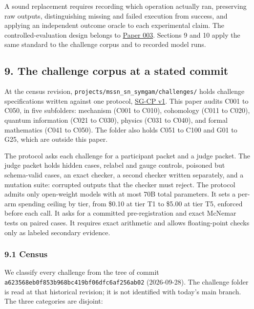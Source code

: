\documentclass[
  11pt,
]{article}
\begin{document}
A sound replacement requires recording which operation actually ran,
preserving raw outputs, distinguishing missing and failed execution from
success, and applying an independent outcome oracle to each experimental
claim. The controlled-evaluation design belongs to
\href{https://github.com/dbccpage/the_symbol_game/blob/23893fc44162555fa12ceda3e1665982e3d7a14e/atlas/coda_atlas/symbol_game/003_pfp_host_admitted_failure_detectors/paper.md}{Paper
003}. Sections 9 and 10 apply the same standard to the challenge corpus
and to recorded model runs.

\hypertarget{the-challenge-corpus-at-a-stated-commit}{%
\subsection{9. The challenge corpus at a stated
commit}\label{the-challenge-corpus-at-a-stated-commit}}

At the census revision,
\nolinkurl{projects/mssn_sn_symgam/challenges/} holds
challenge specifications written against one protocol,
\href{https://github.com/dbccpage/the_symbol_game/blob/a623568eb0f853b968bc419bf06dfc6af256ab02/projects/mssn_sn_symgam/challenges/01_challenge_protocol.md}{SG-CP
v1}. This paper audits C001 to C050, in five subfolders: mechanism (C001
to C010), cohomology (C011 to C020), quantum information (C021 to C030),
physics (C031 to C040), and formal mathematics (C041 to C050). The
folder also holds C051 to C100 and G01 to G25, which are outside this
paper.

The protocol asks each challenge for a participant packet and a judge
packet. The judge packet holds hidden cases, relabel and gauge controls,
poisoned but schema-valid cases, an exact checker, a second checker
written separately, and a mutation suite: corrupted outputs that the
checker must reject. The protocol admits only open-weight models with at
most 70B total parameters. It sets a per-arm spending ceiling by tier,
from \$0.10 at tier T1 to \$5.00 at tier T5, enforced before each call.
It asks for a committed pre-registration and exact McNemar tests on
paired cases. It requires exact arithmetic and allows floating-point
checks only as labeled secondary evidence.

\hypertarget{census}{%
\subsubsection{9.1 Census}\label{census}}

We classify every challenge from the tree of commit
\nolinkurl{a623568eb0f853b968bc419bf06dfc6af256ab02} (2026-09-28). The
challenge folder is read at that historical revision; it is not
identified with today's main branch. The three categories are disjoint:
\end{document}
